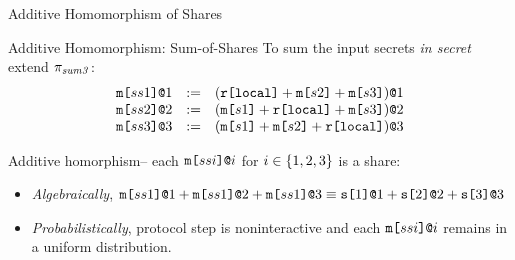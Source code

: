 \documentclass{beamer}
\begin{document}
\begin{frame}{Additive Homomorphism of Shares}

  
  \begin{block}{Additive Homomorphism: Sum-of-Shares}     
  To sum the input secrets \emph{in secret} extend $\pi_{\mathit{sum3}}$:
    $$
    \begin{array}{lll}
      \texttt{m[}ss1\texttt{]}\texttt{@}1 &:=& (\texttt{r[}\mathtt{local}\texttt{]} + \texttt{m[}s2\texttt{]} + \texttt{m[}s3\texttt{]})\texttt{@}1 \\ 
      \texttt{m[}ss2\texttt{]}\texttt{@}2 &:=& (\texttt{m[}s1\texttt{]} + \texttt{r[}\mathtt{local}\texttt{]} + \texttt{m[}s3\texttt{]})\texttt{@}2 \\
      \texttt{m[}ss3\texttt{]}\texttt{@}3 &:=& (\texttt{m[}s1\texttt{]} + \texttt{m[}s2\texttt{]} + \texttt{r[}\mathtt{local}\texttt{]})\texttt{@}3 
    \end{array}
    $$
  \end{block}

  Additive homorphism-- each $\texttt{m[}ssi\texttt{]}\texttt{@}i$ for $i \in \{ 1,2,3 \}$ is a share:
  \begin{itemize}
  \item \emph{Algebraically}, $\texttt{m[}ss1\texttt{]}\texttt{@}1 + \texttt{m[}ss1\texttt{]}\texttt{@}2 + \texttt{m[}ss1\texttt{]}\texttt{@}3 \equiv \texttt{s[}1\texttt{]}\texttt{@}1 + \texttt{s[}2\texttt{]}\texttt{@}2 + \texttt{s[}3\texttt{]}\texttt{@}3$ 
  \item \emph{Probabilistically}, protocol step is noninteractive and each $\texttt{m[}ssi\texttt{]}\texttt{@}i$ remains in a uniform distribution.
  \end{itemize}
  
\end{frame}

\end{document}
